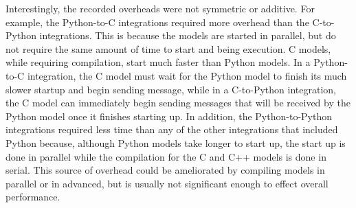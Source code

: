 \documentclass[journal]{IEEEtran}
\newcommand{\todo}[1]{{\color{red}{#1}}}
\begin{document}
Interestingly, the recorded overheads were not symmetric or additive. For example, the Python-to-C integrations required more overhead than the C-to-Python integrations. This is because the models are started in parallel, but do not require the same amount of time to start and being execution. C models, while requiring compilation, start much faster than Python models. In a Python-to-C integration, the C model must wait for the Python model to finish its much slower startup and begin sending message, while in a C-to-Python integration, the C model can immediately begin sending messages that will be received by the Python model once it finishes starting up. In addition, the Python-to-Python integrations required less time than any of the other integrations that included Python because, although Python models take longer to start up, the start up is done in parallel while the compilation for the C and C++ models is done in serial. This source of overhead could be ameliorated by compiling models in parallel or in advanced, but is usually not significant enough to effect overall performance.
%
\todo{figure/table for Matlab \& discussion}

\end{document}
